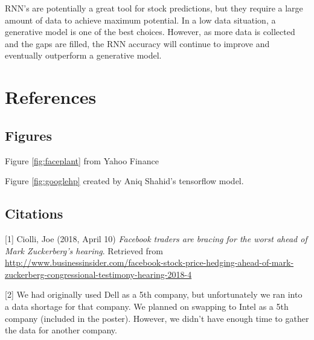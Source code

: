 \documentclass{article}
\begin{document}
RNN’s are potentially a great tool for stock predictions, but they require a large amount of data to achieve maximum potential. In a low data situation, a generative model is one of the best choices. However, as more data is collected and the gaps are filled, the RNN accuracy will continue to improve and eventually outperform a generative model. 


\section{References}

\small

\subsection{Figures}

Figure \ref{fig:faceplant} from Yahoo Finance

Figure \ref{fig:googlehp} created by Aniq Shahid's tensorflow model. 

\subsection{Citations}

[1] Ciolli, Joe (2018, April 10) \emph{Facebook traders are bracing for the worst ahead of Mark Zuckerberg's hearing}. Retrieved from \url{http://www.businessinsider.com/facebook-stock-price-hedging-ahead-of-mark-zuckerberg-congressional-testimony-hearing-2018-4}

[2] We had originally used Dell as a 5th company, but unfortunately we ran into a data shortage for that company. We planned on swapping to Intel as a 5th company (included in the poster). However, we didn't have enough time to gather the data for another company. 
\end{document}
